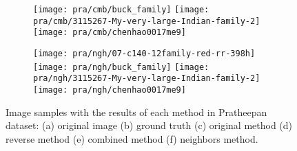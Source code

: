 \begin{figure*}[!htb]
\begin{subfigure}[t]{0.15\textwidth}
        \texttt{[image: pra/cmb/buck\_family]}
        \texttt{[image: pra/cmb/3115267-My-very-large-Indian-family-2]}
        \texttt{[image: pra/cmb/chenhao0017me9]}
        \caption{}
    \end{subfigure}
    \begin{subfigure}[t]{0.15\textwidth}
        \texttt{[image: pra/ngh/07-c140-12family-red-rr-398h]}
        \texttt{[image: pra/ngh/buck\_family]}
        \texttt{[image: pra/ngh/3115267-My-very-large-Indian-family-2]}
        \texttt{[image: pra/ngh/chenhao0017me9]}
        \caption{}
    \end{subfigure}

    \caption[Image samples with the results of each method in Pratheepan dataset]{Image samples with the results of each method in Pratheepan dataset: (a) original image (b) ground truth (c) original method \cite{brancati:17} (d) reverse method (e) combined method (f) neighbors method.}
    \label{fig:results_pratheepan}
\end{figure*}

